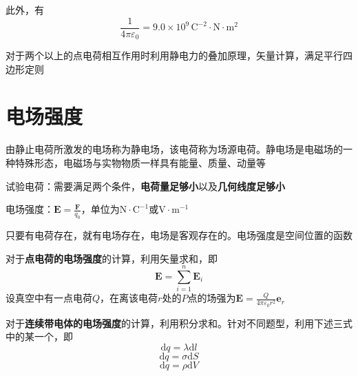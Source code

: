 \documentclass[12pt, a4paper, twoside]{ctexbook}
\begin{document}
此外，有
$$
\frac{1}{4\pi \varepsilon _0}=9.0\times10^{9}\,\mathrm{C}^{-2}\cdot\mathrm{N}\cdot\mathrm{m}^{2}
$$

对于两个以上的点电荷相互作用时利用静电力的叠加原理，矢量计算，满足平行四边形定则
\section{电场强度}
由静止电荷所激发的电场称为静电场，该电荷称为场源电荷。静电场是电磁场的一种特殊形态，电磁场与实物物质一样具有能量、质量、动量等

{\sonti 试验电荷}：需要满足两个条件，\textbf{电荷量足够小}以及\textbf{几何线度足够小}

{\sonti 电场强度}：$\boldsymbol{E}=\frac{\boldsymbol{F}}{q_0}$，单位为$\mathrm{N}\cdot\mathrm{C}^{-1}$或$\mathrm{V}\cdot\mathrm{m}^{-1}$

只要有电荷存在，就有电场存在，电场是客观存在的。电场强度是空间位置的函数

对于\textbf{点电荷的电场强度}的计算，利用矢量求和，即
$$
\boldsymbol{E}=\sum_{i=1}^{n}\boldsymbol{E}_i
$$
设真空中有一点电荷$Q$，在离该电荷$r$处的$P$点的场强为$\boldsymbol{E}=\frac{Q}{4\pi\varepsilon_0r^2}\boldsymbol{e}_r$

对于\textbf{连续带电体的电场强度}的计算，利用积分求和。针对不同题型，利用下述三式中的某一个，即
$$
\mathrm{d}q=\lambda \mathrm{d}l
$$
$$
\mathrm{d}q=\sigma \mathrm{d}S
$$
$$
\mathrm{d}q=\rho \mathrm{d}V
$$
\end{document}
